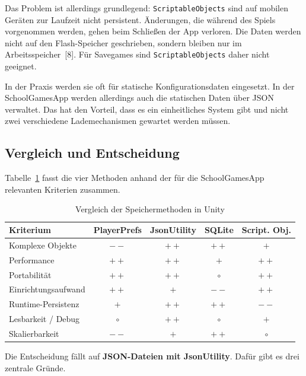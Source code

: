\documentclass[12pt,a4paper]{article}
\begin{document}
Das Problem ist allerdings grundlegend: \texttt{ScriptableObjects} sind auf mobilen Geräten zur Laufzeit nicht persistent. Änderungen, die während des Spiels vorgenommen werden, gehen beim Schließen der App verloren. Die Daten werden nicht auf den Flash-Speicher geschrieben, sondern bleiben nur im Arbeitsspeicher~[8]. Für Savegames sind \texttt{ScriptableObjects} daher nicht geeignet.

In der Praxis werden sie oft für statische Konfigurationsdaten eingesetzt. In der SchoolGamesApp werden allerdings auch die statischen Daten über JSON verwaltet. Das hat den Vorteil, dass es ein einheitliches System gibt und nicht zwei verschiedene Lademechanismen gewartet werden müssen.

\subsection{Vergleich und Entscheidung}

Tabelle~\ref{tab:vergleich-speicher} fasst die vier Methoden anhand der für die SchoolGamesApp relevanten Kriterien zusammen.

\begin{table}[H]
    \centering
    \begin{tabular}{lcccc}
        \toprule
        \textbf{Kriterium} & \textbf{PlayerPrefs} & \textbf{JsonUtility} & \textbf{SQLite} & \textbf{Script. Obj.} \\
        \midrule
        Komplexe Objekte    & $--$  & $++$  & $++$  & $+$  \\
        Performance         & $++$  & $++$  & $+$   & $++$ \\
        Portabilität        & $++$  & $++$  & $\circ$   & $++$ \\
        Einrichtungsaufwand & $++$  & $+$   & $--$  & $++$ \\
        Runtime-Persistenz  & $+$   & $++$  & $++$  & $--$ \\
        Lesbarkeit / Debug  & $\circ$   & $++$  & $\circ$   & $+$  \\
        Skalierbarkeit      & $--$  & $+$   & $++$  & $\circ$  \\
        \bottomrule
    \end{tabular}
    \caption{Vergleich der Speichermethoden in Unity}
    \label{tab:vergleich-speicher}
\end{table}

Die Entscheidung fällt auf \textbf{JSON-Dateien mit JsonUtility}. Dafür gibt es drei zentrale Gründe.
\end{document}
